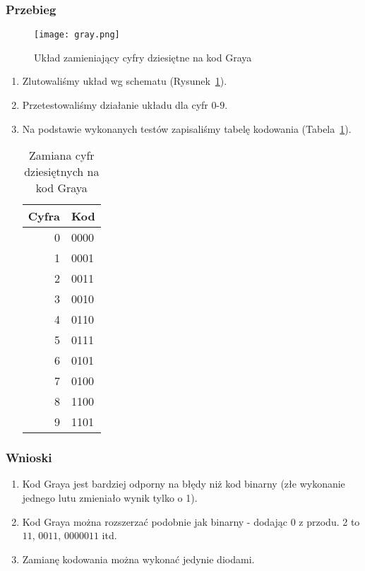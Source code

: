 \documentclass[12pt]{mwart}
\begin{document}
\subsubsection{Przebieg}
\begin{figure}[hbt!]
  \texttt{[image: gray.png]}
  \caption{Układ zamieniający cyfry dziesiętne na kod Graya}
  \label{F2}
\end{figure}
\begin{enumerate}
  \item Zlutowaliśmy układ wg schematu (Rysunek~\ref{F2}).
	\item Przetestowaliśmy działanie układu dla cyfr $0$-$9$.
  \item Na podstawie wykonanych testów zapisaliśmy tabelę kodowania (Tabela~\ref{T4}).
	
  \begin{table}[hbt!]
	\begin{center}
  \begin{tabular}{r | l}
    Cyfra   & Kod \\
    \hline
    0 & 0000 \\  
		1 & 0001 \\ 
		2 & 0011 \\  
		3 & 0010 \\  
		4 & 0110 \\
    5 & 0111 \\  
		6 & 0101 \\
		7 & 0100 \\ 
		8 & 1100 \\ 
		9 & 1101 \\
  \end{tabular}
  \caption{Zamiana cyfr dziesiętnych na kod Graya}
  \label{T4}
	\end{center}
  \end{table}
\end{enumerate}
\subsubsection{Wnioski}
\begin{enumerate}
  \item Kod Graya jest bardziej odporny na błędy niż kod binarny (złe wykonanie jednego lutu zmieniało wynik tylko o 1).
	\item Kod Graya można rozszerzać podobnie jak binarny - dodając $0$ z przodu. 2 to $11$, $0011$, $0000011$ itd.
  \item Zamianę kodowania można wykonać jedynie diodami.
\end{enumerate}
\end{document}
